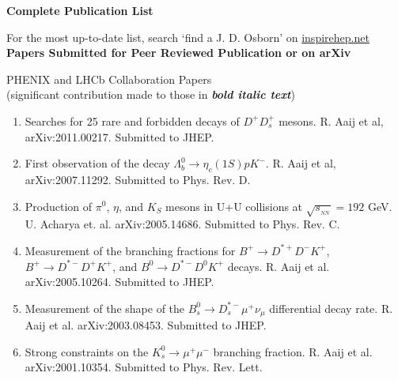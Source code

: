 \documentclass[11pt]{article}
\begin{document}
\begin{flushleft}

\huge\textbf{Complete Publication List}
\vspace{0.5cm}

{\large For the most up-to-date list, search `find a J. D. Osborn' on \href{inspirehep.net}{inspirehep.net} \\}
\vspace{0.5cm}
\Large\textbf{Papers Submitted for Peer Reviewed Publication or on arXiv} \\
\normalsize
\begin{center}
	\begin{flushleft}
	
	\begin{enumerate}
	
	\end{enumerate}
	
	\large PHENIX and LHCb Collaboration Papers\\ (significant contribution made to those in \textbf{\textit{bold italic text}}) \\
	\end{flushleft}
	\begin{enumerate}
	
		\item Searches for 25 rare and forbidden decays of $D^+D_s^+ $ mesons. R. Aaij et al, arXiv:2011.00217. Submitted to JHEP.

		\item First observation of the decay $\Lambda_b^0 \to \eta_c(1S) p K^-$. R. Aaij et al, arXiv:2007.11292. Submitted to Phys. Rev. D.

	
	
		\item Production of $\pi^0$, $\eta$, and $K_S$ mesons in U+U collisions at $\sqrt{s_{_{NN}}}=192$ GeV. U. Acharya et. al. arXiv:2005.14686. Submitted to Phys. Rev. C.

		\item Measurement of the branching fractions for $B^+\to D^{*+}D^-K^+$, $B^+\to D^{*-}D^+K^+$, and $B^0\to D^{*-}D^0K^+$ decays. R. Aaij et al. arXiv:2005.10264. Submitted to JHEP.		
		
		\item Measurement of the shape of the $B_s^0\rightarrow D_s^{*-}\mu^+\nu_\mu$ differential decay rate. R. Aaij et al. arXiv:2003.08453. Submitted to JHEP.
				
		\item Strong constraints on the $K_s^0\rightarrow\mu^+\mu^-$ branching fraction. R. Aaij et al. arXiv:2001.10354. Submitted to Phys. Rev. Lett.
	

\end{enumerate}
\end{center}
\end{flushleft}
\end{document}
